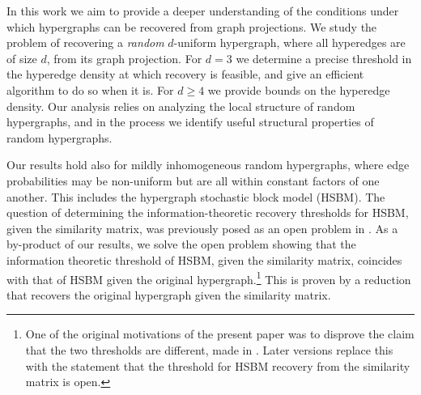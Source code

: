In this work we aim to provide a deeper understanding of the conditions under which hypergraphs can be recovered from graph projections. %
We study the problem of recovering a \emph{random} $d$-uniform hypergraph, where all hyperedges are of size $d$, from its graph projection. For $d=3$ we determine a precise threshold in the hyperedge density at which recovery is feasible, and give an efficient algorithm to do so when it is. For $d\geq 4$ we provide bounds on the hyperedge density. 
Our analysis relies on analyzing the local structure of random hypergraphs, and in the process we identify useful structural properties of random hypergraphs. 


Our results hold also for mildly inhomogeneous random hypergraphs, where edge probabilities may be non-uniform but are all within constant factors of one another. This includes the hypergraph stochastic block model (HSBM).
The question of determining the information-theoretic recovery thresholds for HSBM, given the similarity matrix, was previously posed as an open problem in \cite{gaudio2023community}.
As a by-product of our results, we solve the open problem showing that the information theoretic threshold of HSBM, given the similarity matrix, coincides with that of HSBM given the original hypergraph.\footnote{One of the original motivations of the present paper was to disprove
the claim that the two thresholds are different, made in \cite{gaudio2023community-v1}. Later versions \cite{gaudio2023community} replace this with the statement that the threshold for HSBM recovery from the similarity matrix is open.} This is proven by a reduction that recovers the original hypergraph given the similarity matrix.





